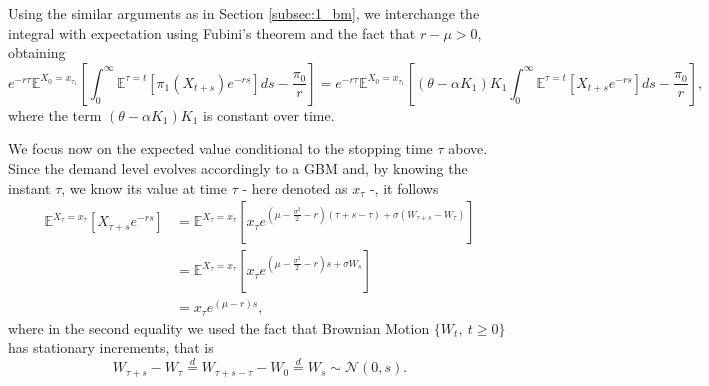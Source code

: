 Using the similar arguments as in Section \ref{subsec:1_bm}, we interchange the integral with expectation using Fubini's theorem and the fact that $r-\mu>0$, obtaining
\begin{equation}
e^{-r\tau} \mathds{E}^{X_0=x_{\tau_1}} \left[  \int_{0}^\infty \mathds{E}^{\tau=t}  \left[ \pi_1(X_{t+s}) e^{-rs}  \right] ds - \frac{\pi_0}{r} \right]=  e^{-r\tau} \mathds{E}^{X_0=x_{\tau_1}} \left[    (\theta-\alpha K_1)K_1  \int_{0}^\infty \mathds{E}^{\tau=t}  \left[  X_{t+s} e^{-rs}  \right] ds - \frac{\pi_0}{r} \right],
\label{eq:3s6}
\end{equation}
where the term $ (\theta-\alpha K_1)K_1$ is constant over time.



We focus now on the expected value conditional to the stopping time $\tau$ above. Since the demand level evolves accordingly to a GBM and, by knowing the instant $\tau$, we know its value at time $\tau$ - here denoted as $x_\tau$ -, it follows 
\begin{align}
\mathds{E}^{X_\tau=x_\tau}  \left[  X_{\tau+s}e^{-rs}  \right] &=\mathds{E}^{X_\tau=x_\tau}  \left[  x_{\tau} e^{\left( \mu- \frac{\sigma^2}{2}-r \right)   (\tau+s-\tau)+\sigma( W_{\tau+s}-W_\tau)}  \right]  \nonumber \\
&=\mathds{E}^{X_\tau=x_\tau}  \left[  x_{\tau} e^{\left( \mu- \frac{\sigma^2}{2}-r \right) s+\sigma W_{s}}   \right]  \nonumber \\
&= x_{\tau} e^{\left( \mu-r \right)s},
\label{eq:3s8}
\end{align}
where in the second equality we used the fact that Brownian Motion $\{ W_t, \ t \geq0 \}$ has stationary increments, that is 
$$W_{\tau+s}-W_\tau \overset{d}{=} W_{\tau+s-\tau}-W_0 \overset{d}{=} W_{s} \sim \mathcal{N}(0,s).$$




